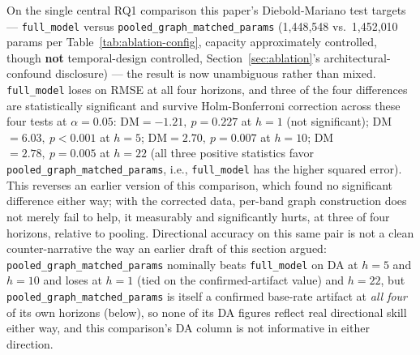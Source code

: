 \documentclass[journal]{IEEEtran}
\begin{document}
On the single central RQ1 comparison this paper's Diebold-Mariano test targets --- \texttt{full\_model} versus \texttt{pooled\_graph\_matched\_params} (1{,}448{,}548 vs.\ 1{,}452{,}010 params per Table~\ref{tab:ablation-config}, capacity approximately controlled, though \textbf{not} temporal-design controlled, Section~\ref{sec:ablation}'s architectural-confound disclosure) --- the result is now unambiguous rather than mixed. \texttt{full\_model} loses on RMSE at all four horizons, and three of the four differences are statistically significant and survive Holm-Bonferroni correction across these four tests at $\alpha=0.05$: DM$=-1.21,\ p=0.227$ at $h=1$ (not significant); DM$=6.03,\ p<0.001$ at $h=5$; DM$=2.70,\ p=0.007$ at $h=10$; DM$=2.78,\ p=0.005$ at $h=22$ (all three positive statistics favor \texttt{pooled\_graph\_matched\_params}, i.e., \texttt{full\_model} has the higher squared error). This reverses an earlier version of this comparison, which found no significant difference either way; with the corrected data, per-band graph construction does not merely fail to help, it measurably and significantly hurts, at three of four horizons, relative to pooling. Directional accuracy on this same pair is not a clean counter-narrative the way an earlier draft of this section argued: \texttt{pooled\_graph\_matched\_params} nominally beats \texttt{full\_model} on DA at $h=5$ and $h=10$ and loses at $h=1$ (tied on the confirmed-artifact value) and $h=22$, but \texttt{pooled\_graph\_matched\_params} is itself a confirmed base-rate artifact at \emph{all four} of its own horizons (below), so none of its DA figures reflect real directional skill either way, and this comparison's DA column is not informative in either direction.
\end{document}
